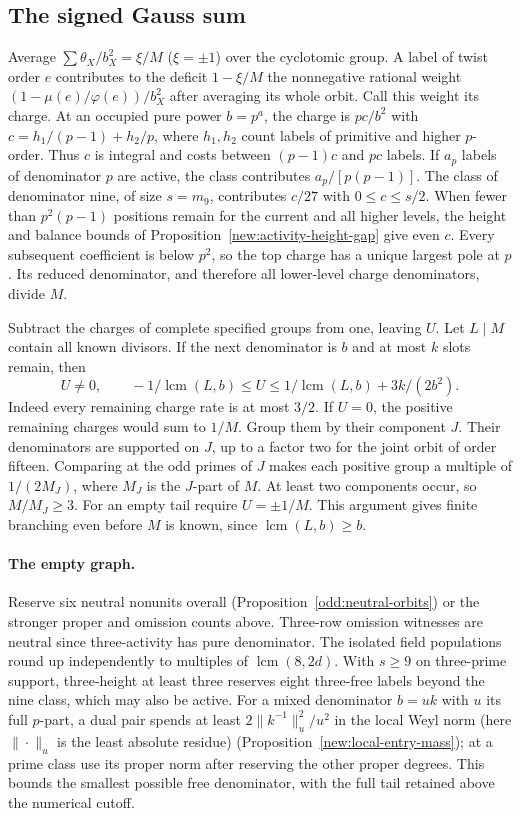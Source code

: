 \documentclass[11pt]{amsart}
\numberwithin{equation}{section}
\theoremstyle{definition}
\theoremstyle{plain}
\DeclareMathOperator{\lcm}{lcm}
\begin{document}
\subsection{The signed Gauss sum}
Average $\sum\theta_X/b_X^2=\xi/M$ ($\xi=\pm1$) over the cyclotomic
group. A label of twist order $e$ contributes to the deficit
$1-\xi/M$ the nonnegative rational weight
$(1-\mu(e)/\varphi(e))/b_X^2$ after averaging its whole orbit. Call
this weight its charge. At an occupied pure power $b=p^a$, the charge
is $pc/b^2$ with $c=h_1/(p-1)+h_2/p$, where $h_1,h_2$ count labels of
primitive and higher $p$-order. Thus $c$ is integral and costs between
$(p-1)c$ and $pc$ labels. If $a_p$ labels of denominator $p$ are active, the class contributes $a_p/[p(p-1)]$. The class of denominator nine, of size $s=m_9$, contributes $c/27$ with $0\le c\le s/2$. When fewer than
$p^2(p-1)$ positions remain for the current and all higher levels, the height and balance bounds of Proposition~\ref{new:activity-height-gap} give even $c$. Every subsequent coefficient is below $p^2$, so the top charge has a unique largest pole at $p$. Its reduced denominator, and therefore all lower-level charge denominators, divide $M$.

Subtract the charges of complete specified groups from one, leaving $U$.
Let $L\mid M$ contain all known divisors. If the next denominator is $b$
and at most $k$ slots remain, then
\begin{equation}\label{eq:odd-deficit-tail}
 U\ne0,\qquad -1/\lcm(L,b)\le U\le1/\lcm(L,b)+3k/(2b^2).
\end{equation}
Indeed every remaining charge rate is at most $3/2$. If $U=0$, the
positive remaining charges would sum to $1/M$. Group them by their
component $J$. Their denominators are supported on $J$, up to a factor
two for the joint orbit of order fifteen. Comparing at the odd primes
of $J$ makes each positive group a multiple of $1/(2M_J)$, where $M_J$
is the $J$-part of $M$. At least two components occur, so $M/M_J\ge3$.
For an empty tail require $U=\pm1/M$. This argument gives finite
branching even before $M$ is known, since $\lcm(L,b)\ge b$.

\paragraph{The empty graph.}

Reserve six neutral nonunits overall (Proposition~\ref{odd:neutral-orbits})
or the stronger proper and omission counts above. Three-row omission
witnesses are neutral since three-activity has pure denominator.
The isolated field populations round up independently to multiples of
$\operatorname{lcm}(8,2d)$. With $s\ge9$ on three-prime support, three-height at least three
reserves eight three-free labels beyond the nine class, which may also
be active. For a mixed denominator $b=uk$ with $u$ its full $p$-part,
a dual pair spends at least $2\|k^{-1}\|_u^2/u^2$ in the local Weyl
norm (here $\|\cdot\|_u$ is the least absolute residue) (Proposition~\ref{new:local-entry-mass}); at a prime class use
its proper norm after reserving the other proper degrees. This bounds
the smallest possible free denominator, with the full tail retained
above the numerical cutoff.
\end{document}
